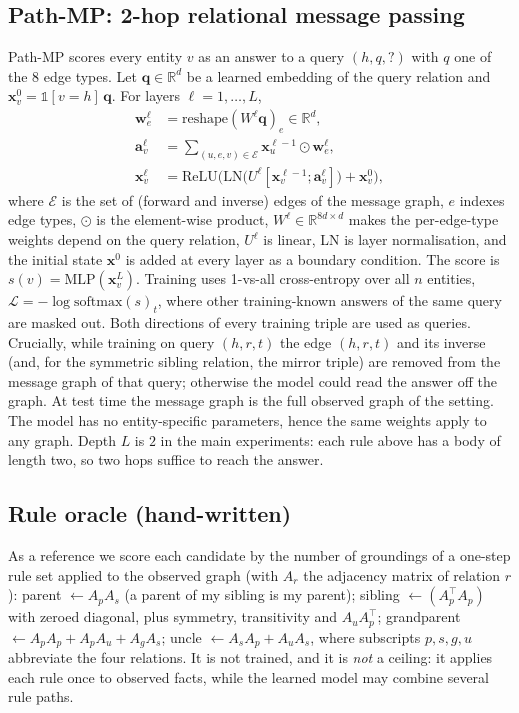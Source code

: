 \subsection{Path-MP: 2-hop relational message passing}
Path-MP scores every entity $v$ as an answer to a query $(h,q,?)$ with $q$ one of the 8 edge types. Let $\mathbf q\in\mathbb R^{d}$ be a learned embedding of the query relation and $\mathbf x^{0}_v=\mathbb 1[v=h]\,\mathbf q$. For layers $\ell=1,\dots,L$,
\begin{align}
\mathbf w^{\ell}_{e}&=\mathrm{reshape}(W^{\ell}\mathbf q)_e\in\mathbb R^{d},\\
\mathbf a^{\ell}_v&=\sum_{(u,e,v)\in\mathcal E}\mathbf x^{\ell-1}_u\odot \mathbf w^{\ell}_{e},\\
\mathbf x^{\ell}_v&=\mathrm{ReLU}\big(\mathrm{LN}\big(U^{\ell}[\mathbf x^{\ell-1}_v;\mathbf a^{\ell}_v]\big)+\mathbf x^{0}_v\big),
\end{align}
where $\mathcal E$ is the set of (forward and inverse) edges of the message graph, $e$ indexes edge types, $\odot$ is the element-wise product, $W^\ell\in\mathbb R^{8d\times d}$ makes the per-edge-type weights depend on the query relation, $U^\ell$ is linear, LN is layer normalisation, and the initial state $\mathbf x^0$ is added at every layer as a boundary condition. The score is $s(v)=\mathrm{MLP}(\mathbf x^{L}_v)$. Training uses 1-vs-all cross-entropy over all $n$ entities, $\mathcal L=-\log\mathrm{softmax}(s)_t$, where other training-known answers of the same query are masked out. Both directions of every training triple are used as queries. Crucially, while training on query $(h,r,t)$ the edge $(h,r,t)$ and its inverse (and, for the symmetric sibling relation, the mirror triple) are removed from the message graph of that query; otherwise the model could read the answer off the graph. At test time the message graph is the full observed graph of the setting. The model has no entity-specific parameters, hence the same weights apply to any graph. Depth $L$ is $2$ in the main experiments: each rule above has a body of length two, so two hops suffice to reach the answer.

\subsection{Rule oracle (hand-written)}
As a reference we score each candidate by the number of groundings of a one-step rule set applied to the observed graph (with $A_r$ the adjacency matrix of relation $r$): parent $\leftarrow A_{p}A_{s}$ (a parent of my sibling is my parent); sibling $\leftarrow (A_p^\top A_p)$ with zeroed diagonal, plus symmetry, transitivity and $A_uA_p^\top$; grandparent $\leftarrow A_pA_p+A_pA_u+A_gA_s$; uncle $\leftarrow A_sA_p+A_uA_s$, where subscripts $p,s,g,u$ abbreviate the four relations. It is not trained, and it is \emph{not} a ceiling: it applies each rule once to observed facts, while the learned model may combine several rule paths.

